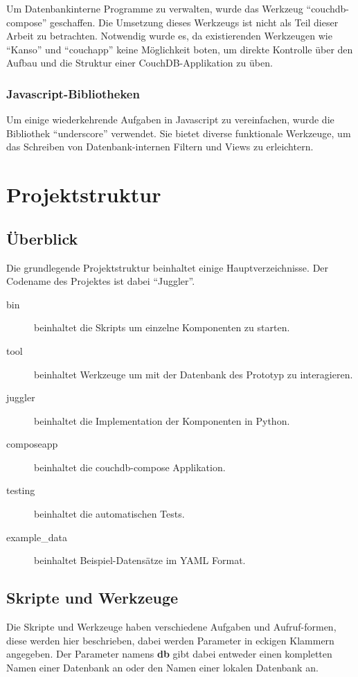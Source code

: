 Um Datenbankinterne Programme zu verwalten,
wurde das Werkzeug ``couchdb-compose'' \cite{couchdb:compose} geschaffen.
Die Umsetzung dieses Werkzeugs ist nicht als Teil dieser Arbeit zu betrachten.
Notwendig wurde es, da existierenden Werkzeugen wie ``Kanso'' und ``couchapp''
keine Möglichkeit boten, um direkte Kontrolle über den Aufbau und die Struktur 
einer CouchDB-Applikation zu üben.

\subsubsection{Javascript-Bibliotheken}

Um einige wiederkehrende Aufgaben in Javascript zu vereinfachen,
wurde die Bibliothek ``underscore'' \cite{javascript:underscore} verwendet.
Sie bietet diverse funktionale Werkzeuge, um das Schreiben
von Datenbank-internen Filtern und Views zu erleichtern.


\section{Projektstruktur}
\label{sec:imp:projektstruktur}

\subsection{Überblick}

Die grundlegende Projektstruktur beinhaltet einige Hauptverzeichnisse.
Der Codename des Projektes ist dabei ``Juggler''.


\begin{description}
    \item[bin] beinhaltet die Skripts um einzelne Komponenten zu starten.
    \item[tool] beinhaltet Werkzeuge um mit der Datenbank des Prototyp zu interagieren.
    \item[juggler] beinhaltet die Implementation der Komponenten in Python.
    \item[composeapp] beinhaltet die couchdb-compose Applikation.
    \item[testing] beinhaltet die automatischen Tests.
    \item[example\_data] beinhaltet Beispiel-Datensätze im \ac{YAML} Format.
\end{description}

\subsection{Skripte und Werkzeuge}
Die Skripte und Werkzeuge haben verschiedene Aufgaben und Aufruf-formen,
diese werden hier beschrieben, dabei werden Parameter in eckigen Klammern angegeben.
Der Parameter namens \textbf{db} gibt dabei entweder einen kompletten Namen einer  Datenbank an oder den Namen einer lokalen Datenbank an.

